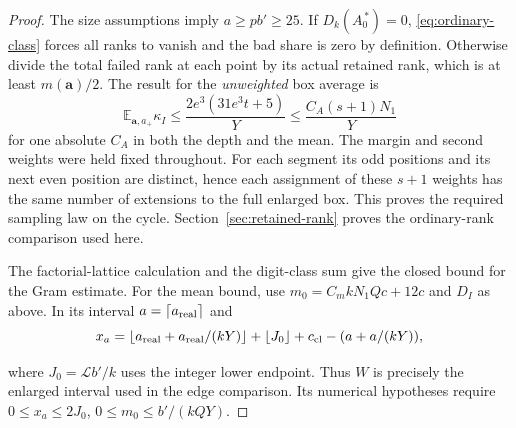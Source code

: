 \begin{proof}
The size assumptions imply
\(a\ge p b'\ge25\).
If \(D_k(A_0^{\,*})=0\), \eqref{eq:ordinary-class} forces all
ranks to vanish and the bad share is zero by definition.
Otherwise divide the total failed rank at each point by its
actual retained rank, which is at least \(m(\mathbf a)/2\).
The result for the \emph{unweighted} box average is
\begin{equation}\label{eq:operational-seg}
 \mathbb E_{\mathbf a,a_+}\kappa_I
    \le \frac{2 e^3(31 e^3 t+5)}{Y}
    \le \frac{C_A(s+1)N_1}{Y}
\end{equation}
for one absolute \(C_A\) in both the depth and the mean.
The margin and second weights were held fixed throughout. For
each segment its odd positions and its next even position are
distinct, hence each assignment of these \(s+1\) weights has the
same number of extensions to the full enlarged box. This proves
the required sampling law on the cycle. Section~\ref{sec:retained-rank} proves the ordinary-rank comparison
used here.

  The factorial-lattice calculation and the digit-class sum give the closed bound for the Gram estimate.
For the mean bound, use \(m_0=C_m kN_1Qc+12c\) and \(D_I\) as above. In its interval
\(a=\lceil a_{\rm real}\rceil\) and
\[
 x_a=\lfloor a_{\rm real}+a_{\rm real}/(kY)\rfloor+ \lfloor J_0\rfloor+c_{\rm cl}-(a+a/(kY)),
\]

where \(J_0=\mathcal L b'/k\) uses the integer lower endpoint.
Thus \(W\) is precisely the enlarged interval used in the
edge comparison. Its numerical hypotheses require
\(0\le x_a\le2J_0\), \(0\le m_0\le b'/(kQY)\).
\end{proof}
